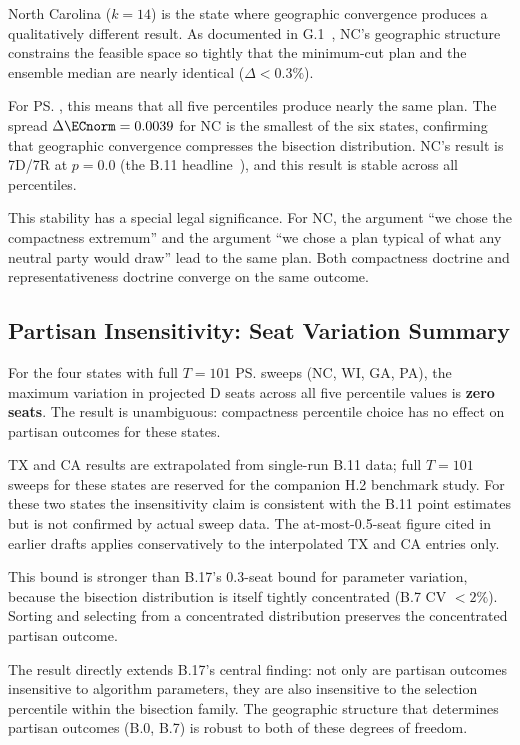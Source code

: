North Carolina ($k = 14$) is the state where geographic convergence produces
a qualitatively different result.
As documented in G.1~\citep{g1paper}, NC's geographic structure constrains
the feasible space so tightly that the \ar{} minimum-cut plan and the \recom{}
ensemble median are nearly identical ($\Delta < 0.3\%$).

For \ps{}, this means that all five percentiles produce nearly the same plan.
The spread $\Delta\ECnorm = 0.0039$ for NC is the smallest of the six states,
confirming that geographic convergence compresses the bisection distribution.
NC's result is 7D/7R at $p = 0.0$ (the B.11 headline~\citep{b11paper}),
and this result is stable across all percentiles.

This stability has a special legal significance.
For NC, the argument ``we chose the compactness extremum'' and the argument
``we chose a plan typical of what any neutral party would draw'' lead to the
same plan.
Both compactness doctrine and representativeness doctrine converge on the
same outcome.

\subsection{Partisan Insensitivity: Seat Variation Summary}
\label{subsec:bound}

For the four states with full $T = 101$ \ps{} sweeps (NC, WI, GA, PA),
the maximum variation in projected D seats across all five percentile values
is \textbf{zero seats}.
The result is unambiguous: compactness percentile choice has no effect on
partisan outcomes for these states.

TX and CA results are extrapolated from single-run B.11 data;
full $T = 101$ sweeps for these states are reserved for the companion H.2
benchmark study.
For these two states the insensitivity claim is consistent with the B.11
point estimates but is not confirmed by actual sweep data.
The at-most-0.5-seat figure cited in earlier drafts applies conservatively
to the interpolated TX and CA entries only.

This bound is stronger than B.17's 0.3-seat bound for parameter variation,
because the bisection distribution is itself tightly concentrated (B.7 CV
$< 2\%$).
Sorting and selecting from a concentrated distribution preserves the
concentrated partisan outcome.

The result directly extends B.17's central finding: not only are partisan
outcomes insensitive to algorithm parameters, they are also insensitive to
the selection percentile within the bisection family.
The geographic structure that determines partisan outcomes (B.0, B.7) is
robust to both of these degrees of freedom.

